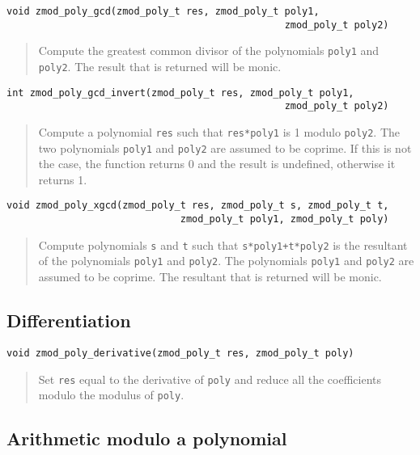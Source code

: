 \documentclass[a4paper,10pt]{article}
\newcommand{\code}{\lstinline}
\begin{document}
\begin{lstlisting}
void zmod_poly_gcd(zmod_poly_t res, zmod_poly_t poly1, 
                                                zmod_poly_t poly2)
\end{lstlisting}
\begin{quote}
Compute the greatest common divisor of the polynomials \code{poly1} and \code{poly2}. The result that is returned will be monic.
\end{quote}

\begin{lstlisting}
int zmod_poly_gcd_invert(zmod_poly_t res, zmod_poly_t poly1, 
                                                zmod_poly_t poly2)
\end{lstlisting}
\begin{quote}
Compute a polynomial \code{res} such that \code{res*poly1} is 1 modulo \code{poly2}. The two polynomials \code{poly1} and \code{poly2} are assumed to be coprime. If this is not the case, the function returns 0 and the result is undefined, otherwise it returns 1.
\end{quote}

\begin{lstlisting}
void zmod_poly_xgcd(zmod_poly_t res, zmod_poly_t s, zmod_poly_t t,  
                              zmod_poly_t poly1, zmod_poly_t poly)
\end{lstlisting}
\begin{quote}
Compute polynomials \code{s} and \code{t} such that \code{s*poly1+t*poly2} is the resultant of the polynomials \code{poly1} and \code{poly2}. The polynomials \code{poly1} and \code{poly2} are assumed to be coprime. The resultant that is returned will be monic.
\end{quote}

\subsection{Differentiation}
\begin{lstlisting}
void zmod_poly_derivative(zmod_poly_t res, zmod_poly_t poly)
\end{lstlisting}
\begin{quote}
Set \code{res} equal to the derivative of \code{poly} and reduce all the coefficients modulo the modulus of \code{poly}.
\end{quote}

\subsection{Arithmetic modulo a polynomial}
\end{document}

